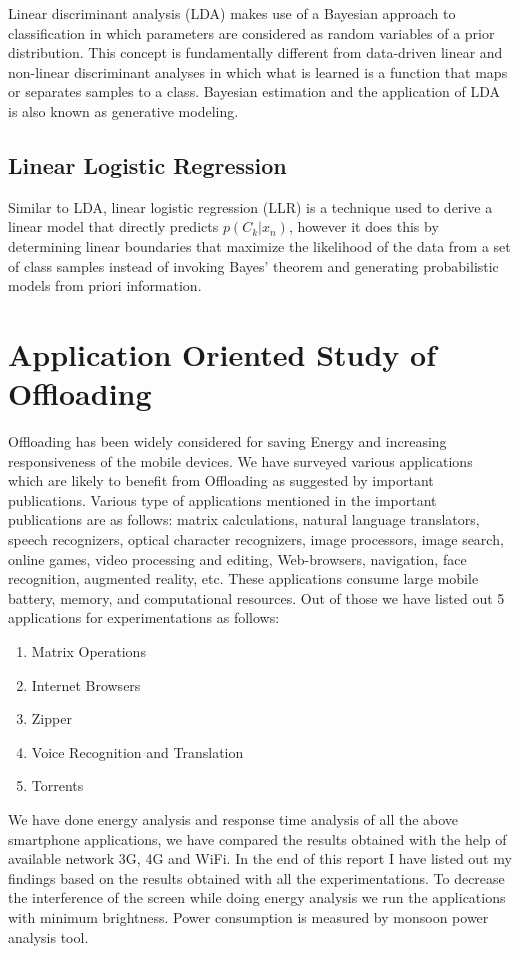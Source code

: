 \documentclass{report}
\begin{document}
Linear discriminant analysis (LDA) makes use of a Bayesian approach to classification in which parameters are considered as random variables of a prior distribution. This concept is fundamentally different from data-driven linear and non-linear discriminant analyses in which what is learned is a function that maps or separates samples to a class. Bayesian estimation and the application of LDA is also known as generative modeling.

\section{Linear Logistic Regression}
Similar to LDA, linear logistic regression (LLR) is a technique used to derive a linear
model that directly predicts $p(C_k |x_n ) $, however it does this by determining linear
boundaries that maximize the likelihood of the data from a set of class samples instead of
invoking Bayes’ theorem and generating probabilistic models from priori information.


\chapter{Application Oriented Study of Offloading}
\label{chap:applicationorientedstudy}
Offloading has been widely considered for saving Energy and increasing responsiveness of the mobile
devices.
We have surveyed various applications which are likely to benefit from Offloading as suggested by
important publications. Various type of applications mentioned in the important publications are as follows:
matrix calculations, natural language translators, speech recognizers, optical character recognizers, image processors, image
search, online games, video processing and editing, Web-browsers, navigation, face recognition, augmented reality, etc.
These applications consume large mobile battery, memory, and computational resources.
Out of those we have listed out 5 applications for experimentations as follows:
\begin{enumerate}
\item Matrix Operations
\item Internet Browsers
\item Zipper
\item Voice Recognition and Translation
\item Torrents
\end{enumerate}
We have done energy analysis and response time analysis of all the above smartphone applications, we have compared the results obtained with the help of available network 3G, 4G and WiFi. In the end of this report I have listed out my findings based on the results obtained with all the experimentations.
To decrease the interference of the screen while doing energy analysis we run the applications with minimum brightness. Power consumption is measured by monsoon power analysis tool. \\
\end{document}
